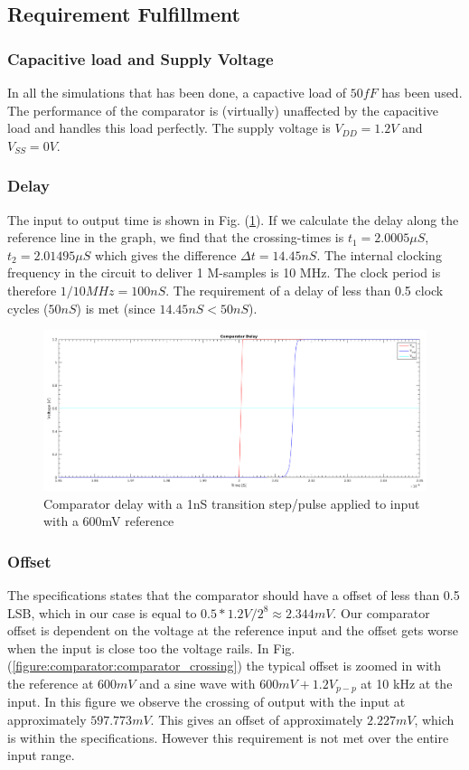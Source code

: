 \documentclass[english, 12pt, a4paper]{ifimaster}
\begin{document}
\subsection{Requirement Fulfillment}
\subsubsection{Capacitive load and Supply Voltage}
In all the simulations that has been done, a capactive load of \(50 fF\) has been used. The performance of the comparator is (virtually) unaffected by the capacitive load and handles this load perfectly.
The supply voltage is \(V_{DD} = 1.2V\) and \(V_{SS} = 0V\).

\subsubsection{Delay}
The input to output time is shown in Fig. (\ref{figure:comparator:comparator_delay}). 
If we calculate the delay along the reference line in the graph, we find that the crossing-times is \( t_1 = 2.0005\mu S\), \(t_2 = 2.01495\mu S \) which gives the difference \(\Delta t = 14.45nS \).
The internal clocking frequency in the circuit to deliver 1 M-samples is 10 MHz. The clock period is therefore \(1/10MHz = 100nS\). 
The requirement of a delay of less than 0.5 clock cycles (\(50nS\)) is met (since \(14.45nS < 50nS\)).

\begin{figure}[!ht]
    \centering
    \includegraphics[width=\textwidth]{img/comparator/comparator_delay_1ns_tr_600mv_ref}
    \caption{Comparator delay with a 1nS transition step/pulse applied to input with a 600mV reference}
    \label{figure:comparator:comparator_delay}
\end{figure}

\subsubsection{Offset}
The specifications states that the comparator should have a offset of less than 0.5 LSB, which in our case is equal to \(0.5 * 1.2V/2^8 \approx 2.344mV\). 
Our comparator offset is dependent on the voltage at the reference input and the offset gets worse when the input is close too the voltage rails.
In Fig. (\ref{figure:comparator:comparator_crossing}) the typical offset is zoomed in with the reference at \(600 mV\) and a sine wave with \(600 mV + 1.2V_{p-p}\) at 10 kHz at the input. 
In this figure we observe the crossing of output with the input at approximately \(597.773 mV\). This gives an offset of approximately \(2.227 mV\), which is within the specifications. 
However this requirement is not met over the entire input range.
\end{document}
